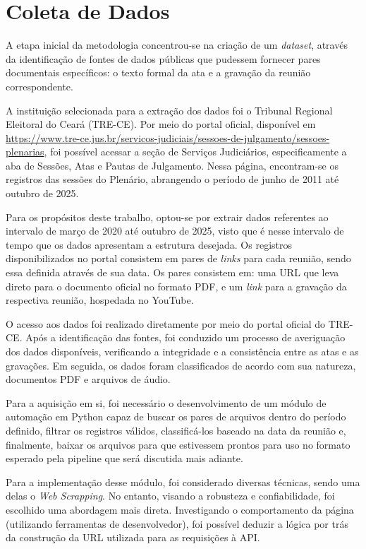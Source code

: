 \section{Coleta de Dados}
\label{sec:coleta-dados}

A etapa inicial da metodologia concentrou-se na criação de um \textit{dataset}, através da identificação de fontes de dados públicas que pudessem fornecer pares documentais específicos: o texto formal da ata e a gravação da reunião correspondente.

A instituição selecionada para a extração dos dados foi o Tribunal Regional Eleitoral do Ceará (TRE-CE). Por meio do portal oficial, disponível em \url{https://www.tre-ce.jus.br/servicos-judiciais/sessoes-de-julgamento/sessoes-plenarias}, foi possível acessar a seção de Serviços Judiciários, especificamente a aba de Sessões, Atas e Pautas de Julgamento. Nessa página, encontram-se os registros das sessões do Plenário, abrangendo o período de junho de 2011 até outubro de 2025.

Para os propósitos deste trabalho, optou-se por extrair dados referentes ao intervalo de março de 2020 até outubro de 2025, visto que é nesse intervalo de tempo que os dados apresentam a estrutura desejada. Os registros disponibilizados no portal consistem em pares de \textit{links} para cada reunião, sendo essa definida através de sua data. Os pares consistem em: uma URL que leva direto para o documento oficial no formato PDF, e um \textit{link} para a gravação da respectiva reunião, hospedada no YouTube. 

O acesso aos dados foi realizado diretamente por meio do portal oficial do TRE-CE. Após a identificação das fontes, foi conduzido um processo de averiguação dos dados disponíveis, verificando a integridade e a consistência entre as atas e as gravações. Em seguida, os dados foram classificados de acordo com sua natureza, documentos PDF e arquivos de áudio.

Para a aquisição em si, foi necessário o desenvolvimento de um módulo de automação em Python capaz de buscar os pares de arquivos dentro do período definido, filtrar os registros válidos, classificá-los baseado na data da reunião e, finalmente, baixar os arquivos para que estivessem prontos para uso no formato esperado pela pipeline que será discutida mais adiante.

Para a implementação desse módulo, foi considerado diversas técnicas, sendo uma delas o \textit{Web Scrapping}. No entanto, visando a robusteza e confiabilidade, foi escolhido uma abordagem mais direta. Investigando o comportamento da página (utilizando ferramentas de desenvolvedor), foi possível deduzir a lógica por trás da construção da URL utilizada para as requisições à API.
\vspace{0.21cm}

